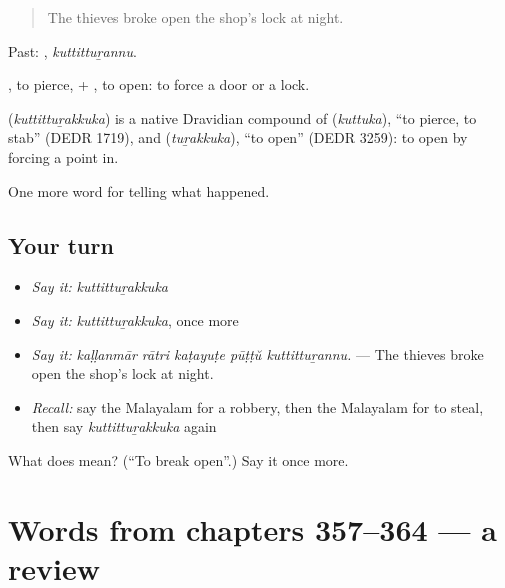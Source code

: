 \begin{quote}
The thieves broke open the shop's lock at night.
\end{quote}

Past: , \emph{kuttittuṟannu}.

, to pierce, + , to open: to force a door or a lock.

\begin{cousinweb}
\textbf{} (\emph{kuttittuṟakkuka}) is a native Dravidian compound of  (\emph{kuttuka}), \textquotedblleft{}to pierce, to stab\textquotedblright{} (DEDR 1719), and  (\emph{tuṟakkuka}), \textquotedblleft{}to open\textquotedblright{} (DEDR 3259): to open by forcing a point in.
\end{cousinweb}

\begin{grammarlens}[title={What you've built}]
One more word for telling what happened.
\end{grammarlens}

\subsection*{Your turn}
\begin{itemize}
\raggedright
  \item \emph{Say it:} \emph{kuttittuṟakkuka}
  \item \emph{Say it:} \emph{kuttittuṟakkuka}, once more
  \item \emph{Say it:} \emph{kaḷḷanmār rātri kaṭayuṭe pūṭṭŭ kuttittuṟannu.} — The thieves broke open the shop's lock at night.
  \item \emph{Recall:} say the Malayalam for a robbery, then the Malayalam for to steal, then say \emph{kuttittuṟakkuka} again
\end{itemize}

\begin{tcolorbox}[breakable,colback=teal!4,colframe=teal!35!black,title={Before you move on}]
What does  mean? (\textquotedblleft{}To break open\textquotedblright{}.) Say it once more.
\end{tcolorbox}
\section[(dialogue)]{Words from chapters 357–364 — a review}

\label{lesson:ML-R364-review-357-364}



